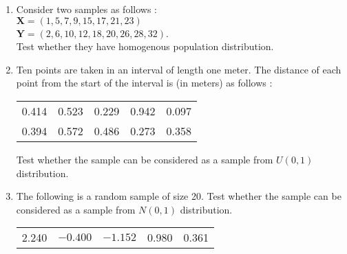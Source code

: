 \documentclass[11pt, a4paper]{article}
\begin{document}
\begin{enumerate}
	
	\item Consider two samples as follows : \\
	
	$\textbf{X} = (1, 5, 7, 9, 15, 17, 21, 23)$ \\
	
	$\textbf{Y} = (2, 6, 10, 12, 18, 20, 26, 28, 32)$. \\
	
	Test whether they have homogenous population distribution.
	
	
	
	
	





	\item Ten points are taken in an interval of length one meter. The distance of each point from the start of the interval is (in meters) as follows :
	
	\begin{table}[!htbp]
	\def\arraystretch{1.5}
	
	\begin{center}
	
	\begin{tabular}{ccccc}
	0.414 & 0.523 & 0.229 & 0.942 & 0.097 \\
	
	0.394 & 0.572 & 0.486 & 0.273 & 0.358 
	\end{tabular}
	\end{center}
	\end{table}
	
	Test whether the sample can be considered as a sample from $U(0, 1)$ distribution.
	
	
	
	
	
	
	
	
	
	
	
	
	
	\item The following is a random sample of size 20. Test whether the sample can be considered as a sample from $N(0, 1)$ distribution.
	
	\begin{table}[!htbp]
	\def\arraystretch{1.5}
	
	\begin{center}
	\begin{tabular}{ccccc}
	
	2.240 & $-0.400$ & $-1.152$ & 0.980 & 0.361 \\
	

\end{tabular}
\end{center}
\end{table}
\end{enumerate}
\end{document}
